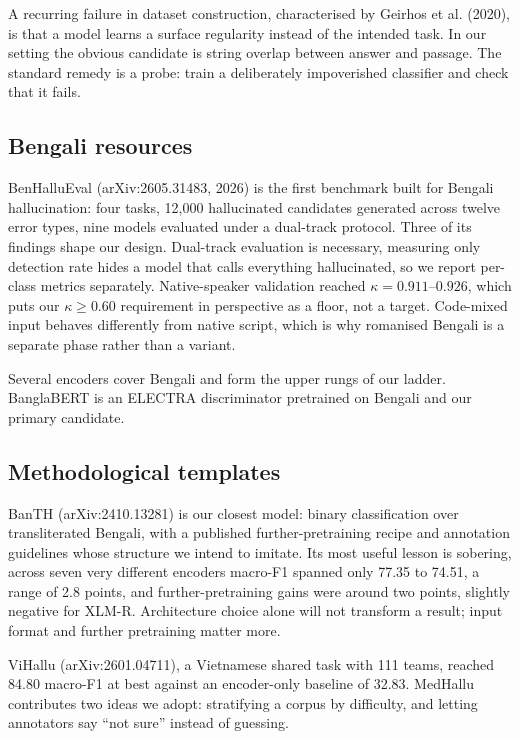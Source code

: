\documentclass[12pt,a4paper]{article}
\begin{document}
A recurring failure in dataset construction, characterised by Geirhos et al.
(2020), is that a model learns a surface regularity instead of the intended
task. In our setting the obvious candidate is string overlap between answer and
passage. The standard remedy is a probe: train a deliberately impoverished
classifier and check that it fails.

\subsection{Bengali resources}

BenHalluEval (arXiv:2605.31483, 2026) is the first benchmark built for
Bengali hallucination: four tasks, 12{,}000 hallucinated candidates generated
across twelve error types, nine models evaluated under a dual-track protocol.
Three of its findings shape our design. Dual-track evaluation is
necessary, measuring only detection rate hides a model that calls everything
hallucinated, so we report per-class metrics separately. Native-speaker
validation reached $\kappa = 0.911$--$0.926$, which puts our $\kappa \geq 0.60$
requirement in perspective as a floor, not a target. Code-mixed input
behaves differently from native script, which is why romanised Bengali is a
separate phase rather than a variant.

Several encoders cover Bengali and form the upper rungs of our ladder.
BanglaBERT is an ELECTRA discriminator pretrained on
Bengali and our primary candidate.

\subsection{Methodological templates}

BanTH (arXiv:2410.13281) is our closest model: binary classification
over transliterated Bengali, with a published further-pretraining recipe and
annotation guidelines whose structure we intend to imitate. Its most useful
lesson is sobering, across seven very different encoders macro-F1 spanned only
77.35 to 74.51, a range of 2.8 points, and further-pretraining gains were around
two points, slightly negative for XLM-R. Architecture choice alone will not
transform a result; input format and further pretraining matter more.

ViHallu (arXiv:2601.04711), a Vietnamese shared task with 111 teams,
reached 84.80 macro-F1 at best against an encoder-only baseline of 32.83.
MedHallu contributes two ideas we adopt: stratifying a corpus by
difficulty, and letting annotators say ``not sure'' instead of guessing.
\end{document}
